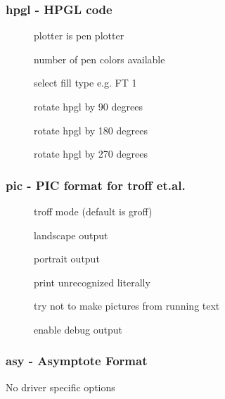 \documentclass[english,a4paper]{article}
\begin{document}
\subsubsection{hpgl - HPGL code}
\begin{description}
\item[] 
plotter is pen plotter


\item[] 
number of pen colors available


\item[] 
select fill type e.g. FT 1


\item[] 
rotate hpgl by 90 degrees


\item[] 
rotate hpgl by 180 degrees


\item[] 
rotate hpgl by 270 degrees


\end{description}
\subsubsection{pic - PIC format for troff et.al.}
\begin{description}
\item[] 
troff mode (default is groff)


\item[] 
landscape output


\item[] 
portrait output


\item[] 
print unrecognized literally


\item[] 
try not to make pictures from running text


\item[] 
enable debug output


\end{description}
\subsubsection{asy - Asymptote Format}
No driver specific options
\end{document}
